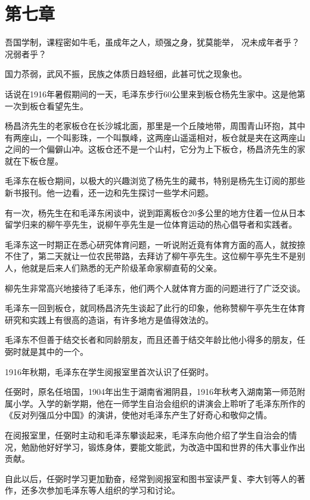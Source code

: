 \documentclass[../../dazhuan.tex]{subfiles}
\begin{document}
\chapter*{第七章}
\begin{pref}
	吾国学制，课程密如牛毛，虽成年之人，顽强之身，犹莫能举，	
况未成年者乎？况弱者乎？

国力苶弱，武风不振，民族之体质日趋轻细，此甚可忧之现象也。
\end{pref}

话说在1916年暑假期间的一天，毛泽东步行60公里来到板仓杨先生家中。这是他第一次到板仓看望先生。

杨昌济先生的老家板仓在长沙城北面，那里是一个丘陵地带，周围青山环抱，其中有两座山，一个叫影珠，一个叫飘峰，这两座山遥遥相对，板仓就是夹在这两座山之间的一个偏僻山冲。这板仓还不是一个山村，它分为上下板仓，杨昌济先生的家就在下板仓屋。

毛泽东在板仓期间，以极大的兴趣浏览了杨先生的藏书，特别是杨先生订阅的那些新书报刊。他一边看，还一边和先生探讨一些学术问题。

有一次，杨先生在和毛泽东闲谈中，说到距离板仓20多公里的地方住着一位从日本留学归来的柳午亭先生，说柳午亭先生是一位体育运动的热心倡导者和实践者。

毛泽东这一时期正在悉心研究体育问题，一听说附近竟有体育方面的高人，就按捺不住了，第二天就让一位农民带路，去拜访了柳午亭先生。这位柳午亭先生不是别人，他就是后来人们熟悉的无产阶级革命家柳直荀的父亲。

柳先生非常高兴地接待了毛泽东，他们两个人就体育方面的问题进行了广泛交谈。

毛泽东一回到板仓，就同杨昌济先生谈起了此行的印象，他称赞柳午亭先生在体育研究和实践上有很高的造诣，有许多地方是值得效法的。

毛泽东不但善于结交长者和同龄朋友，而且还善于结交年龄比他小得多的朋友，任弼时就是其中的一个。

1916年秋期，毛泽东在学生阅报室里首次认识了任弼时。

任弼时，原名任培国，1904年出生于湖南省湘阴县，1916年秋考入湖南第一师范附属小学。入学的新学期，他在一师学生自治会组织的讲演会上聆听了毛泽东所作的《反对列强瓜分中国》的演讲，使他对毛泽东产生了好奇心和敬仰之情。

在阅报室里，任弼时主动和毛泽东攀谈起来，毛泽东向他介绍了学生自治会的情况，勉励他好好学习，锻炼身体，要能文能武，为改造中国和世界的伟大事业作出贡献。

自此以后，任弼时学习更加勤奋，经常到阅报室和图书室读严复、李大钊等人的著作，还多次参加毛泽东等人组织的学习和讨论。
\end{document}
